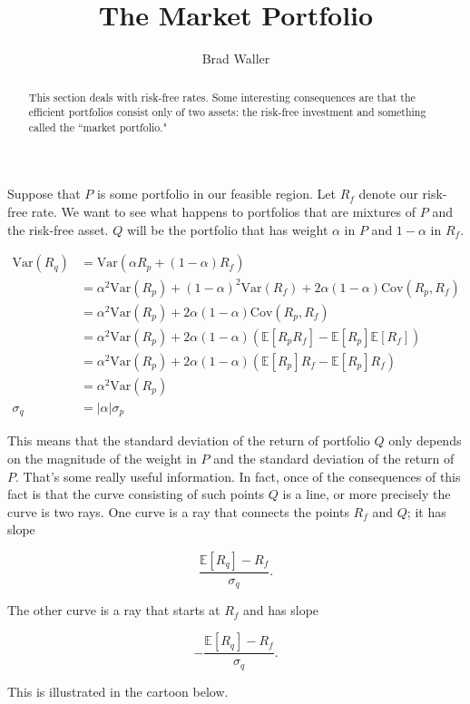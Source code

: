 \documentclass{ximera}
\author{Brad Waller}
\title{The Market Portfolio}
\begin{document}
\begin{abstract}
This section deals with risk-free rates. Some interesting consequences are that the efficient portfolios consist only of two assets: the risk-free investment and something called the ``market portfolio."
\end{abstract}

\maketitle

Suppose that $P$ is some portfolio in our feasible region. Let $R_f$ denote our risk-free rate. We want to see what happens to portfolios that are mixtures of $P$ and the risk-free asset. $Q$ will be the portfolio that has weight $\alpha$ in $P$ and $1-\alpha$ in $R_f$. 

\begin{align*}
\text{Var}(R_q) 		&=\text{Var}(\alpha R_p+(1-\alpha)R_f)\\
				&=\alpha^2\text{Var}(R_p)+(1-\alpha)^2\text{Var}(R_f)+2\alpha(1-\alpha)\text{Cov}(R_p, R_f)\\
				&=\alpha^2\text{Var}(R_p)+2\alpha(1-\alpha)\text{Cov}(R_p, R_f)\\
				&=\alpha^2\text{Var}(R_p)+2\alpha(1-\alpha)(\mathbb{E}[R_pR_f]-\mathbb{E}[R_p]\mathbb{E}[R_f])\\
				&=\alpha^2\text{Var}(R_p)+2\alpha(1-\alpha)(\mathbb{E}[R_p]R_f-\mathbb{E}[R_p]R_f)\\
				&=\alpha^2\text{Var}(R_p)\\
\sigma_q 			&=|\alpha|\sigma_p
\end{align*}

This means that the standard deviation of the return of portfolio $Q$ only depends on the magnitude of the weight in $P$ and the standard deviation of the return of $P$. That's some really useful information. In fact, once of the consequences of this fact is that the curve consisting of such points $Q$ is a line, or more precisely the curve is two rays. One curve is a ray that connects the points $R_f$ and $Q$; it has slope

\[
\frac{\mathbb{E}[R_q]-R_f}{\sigma_q}.
\]

The other curve is a ray that starts at $R_f$ and has slope 

\[
-\frac{\mathbb{E}[R_q]-R_f}{\sigma_q}.
\]

This is illustrated in the cartoon below. 
\end{document}
